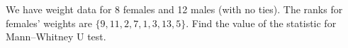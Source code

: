 
\begin{question}
We have weight data for 8 females and 12 males (with no ties). The ranks for females' weights are \(\{9, 11, 2, 7, 1, 3, 13, 5\}\). Find the value of the statistic for Mann--Whitney U test.
\end{question}


